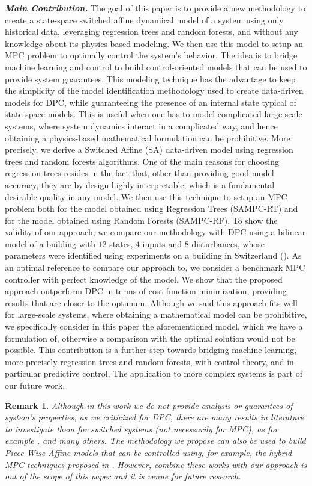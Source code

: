 \documentclass[]{ifacconf}  %
\newtheorem{remark}{Remark}
\begin{document}
\emph{\textbf{Main Contribution.}} The goal of this paper is to provide a new methodology to create a state-space switched affine dynamical model of a system using only historical data, leveraging regression trees and random forests, and without any knowledge about its physics-based modeling. We then use this model to setup an MPC problem to optimally control the system's behavior.
The idea is to bridge machine learning and control to build control-oriented models that can be used to provide system guarantees.
This modeling technique has the advantage to keep the simplicity of the model identification methodology used to create data-driven models for DPC, while guaranteeing the presence of an internal state typical of state-space models.
This is useful when one has to model complicated large-scale systems, where system dynamics interact in a complicated way, and hence obtaining a physics-based mathematical formulation can be prohibitive.
More precisely, we derive a Switched Affine (SA) data-driven model using regression trees and random forests algorithms.
One of the main reasons for choosing regression trees resides in the fact that, other than providing good model accuracy, they are by design highly interpretable, which is a fundamental desirable quality in any model. We then use this technique to setup an MPC problem both for the model obtained using Regression Trees (SAMPC-RT) and for the model obtained using Random Forests (SAMPC-RF). 
To show the validity of our approach, we compare our methodology with DPC using a bilinear model of a building with $12$ states, $4$ inputs and $8$ disturbances, whose parameters were identified using experiments on a building in Switzerland (\cite{OldewurtelPHD2011}).
As an optimal reference to compare our approach to, we consider a benchmark MPC controller with perfect knowledge of the model.
We show that the proposed approach outperform DPC in terms of cost function minimization, providing results that are closer to the optimum.
Although we said this approach fits well for large-scale systems, where obtaining a mathematical model can be prohibitive, we specifically consider in this paper the aforementioned model, which we have a formulation of, otherwise a comparison with the optimal solution would not be possible.
This contribution is a further step towards bridging machine learning, more precisely regression trees and random forests, with control theory, and in particular predictive control.
The application to more complex systems is part of our future work.
\begin{remark}
	Although in this work we do not provide analysis or guarantees of system's properties, as we criticized for DPC, there are many results in literature to investigate them for switched systems (not necessarily for MPC), as for example \cite{MullerJPC2012,BraatzAutomatica2016,DanielsonACC2016,HespanhaTAC2004,LiberzonAutomatica1999,WangTAC2002,LeeAutomatica2002}, and many others. The methodology we propose can also be used to build Piece-Wise Affine models that can be controlled using, for example, the hybrid MPC techniques proposed in \cite{LazarTAC2006,BemporadAutomatica1999}. However,
	combine these works with our approach is out of the scope of this paper and it is venue for future research.
\end{remark}
\end{document}
